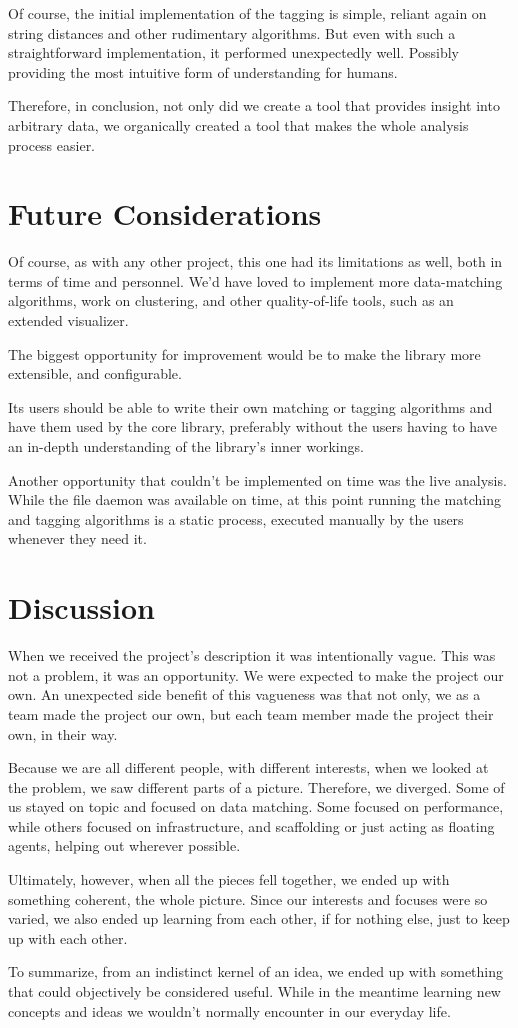 Of course, the initial implementation of the tagging is simple, reliant again on
string distances and other rudimentary algorithms.
But even with such a straightforward implementation, it performed unexpectedly well.
Possibly providing the most intuitive form of understanding for humans.

Therefore, in conclusion, not only did we create a tool that provides insight into arbitrary data,
we organically created a tool that makes the whole analysis process easier.


\section{Future Considerations}
Of course, as with any other project, this one had its limitations as well, both
in terms of time and personnel.
We'd have loved to implement more data-matching algorithms,
work on clustering, and other quality-of-life tools, such as an extended visualizer.

The biggest opportunity for improvement would be to make the library more extensible,
and configurable.

Its users should be able to write their own matching or tagging algorithms and have
them used by the core library, preferably without the users having to have an in-depth
understanding of the library's inner workings.

Another opportunity that couldn't be implemented on time was the live analysis.
While the file daemon was available on time, at this point running the matching
and tagging algorithms is a static process, executed manually by the users
whenever they need it.


\section{Discussion}

When we received the project's description it was intentionally vague.
This was not a problem, it was an opportunity.
We were expected to make the project our own.
An unexpected side benefit of this vagueness was that not only, we as a team
made the project our own, but each team member made the project their own, in their way.

Because we are all different people, with different interests, when we looked at the problem, we saw different parts of a picture.
Therefore, we diverged.
Some of us stayed on topic and focused on data matching.
Some focused on performance, while others focused on infrastructure, and scaffolding or
just acting as floating agents, helping out wherever possible.

Ultimately, however, when all the pieces fell together, we ended up with something coherent, the whole picture.
Since our interests and focuses were so varied, we also ended up learning from each other,
if for nothing else, just to keep up with each other.

To summarize, from an indistinct kernel of an idea, we ended up with something
that could objectively be considered useful.
While in the meantime learning new concepts and ideas we wouldn't normally encounter in our
everyday life.

